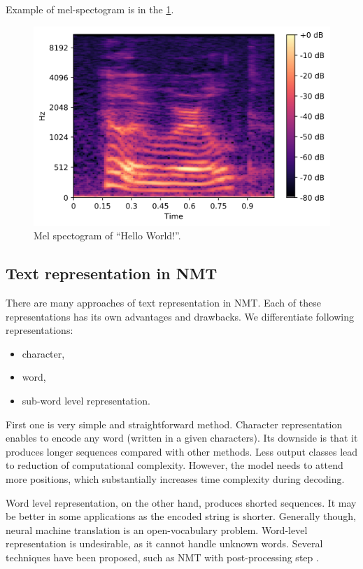 Example of mel-spectogram is in the \cref{fig:mel}.

\begin{figure}[h]
 \centering
 \includegraphics[width=\linewidth]{img/mel.png}
 \caption{Mel spectogram of ``Hello World!''.}
 \label{fig:mel}
\end{figure}

\subsection{Text representation in NMT}

There are many approaches of text representation in NMT. Each of these representations has its own advantages and drawbacks. We differentiate following representations:

\begin{itemize}
    \item character,
    \item word,
    \item sub-word level representation.
\end{itemize}

First one is very simple and straightforward method. Character representation enables to encode any word (written in a given characters). Its downside is that it produces longer sequences compared with other methods. Less output classes lead to reduction of computational complexity. However, the model needs to attend more positions, which substantially increases time complexity during decoding.

Word level representation, on the other hand, produces shorted sequences. It may be better in some applications as the encoded string is shorter. Generally though, neural machine translation is an open-vocabulary problem. Word-level representation is undesirable, as it cannot handle unknown words. Several techniques have been proposed, such as NMT with post-processing step .

